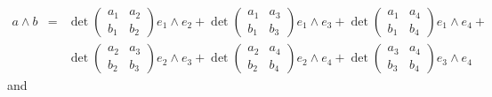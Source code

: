\documentclass[color=black,11pt]{elegantpaper}
\begin{document}
\begin{eqnarray*}
a\wedge b &= & \det\left( \begin{array}{cc}
                                       a_1 & a_2 \\
                                       b_1 & b_2
                                   \end{array}\right) e_1\wedge e_2 +
             \det\left( \begin{array}{cc}
                                       a_1 & a_3 \\
                                       b_1 & b_3
                                   \end{array}\right) e_1 \wedge e_3 +
             \det\left( \begin{array}{cc}
                                       a_1 & a_4 \\
                                       b_1 & b_4
                                   \end{array}\right) e_1 \wedge e_4 +\\
 & & \det\left( \begin{array}{cc}
                                       a_2 & a_3 \\
                                       b_2 & b_3
                                   \end{array}\right) e_2\wedge e_3 +
             \det\left( \begin{array}{cc}
                                       a_2 & a_4 \\
                                       b_2 & b_4
                                   \end{array}\right) e_2 \wedge e_4 +
             \det\left( \begin{array}{cc}
                                       a_3 & a_4 \\
                                       b_3 & b_4
                                   \end{array}\right) e_3 \wedge e_4 
\end{eqnarray*}
and
\end{document}
